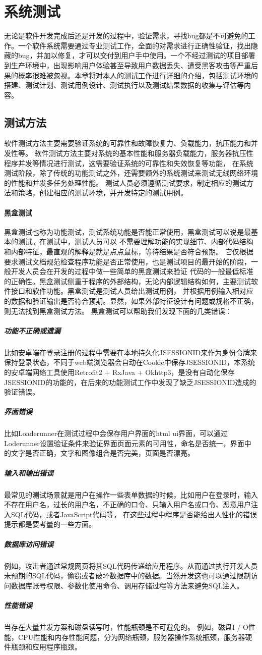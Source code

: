 \section{系统测试}
无论是软件开发完成后还是开发的过程中，验证需求，寻找bug都是不可避免的工作。一个软件系统需要通过专业测试工作，全面的对需求进行正确性验证，找出隐藏的bug，并加以修复，才可以交付到用户手中使用。一个不经过测试的项目部署到生产环境中，出现影响用户体验甚至导致用户数据丢失、遭受黑客攻击等严重后果的概率很难被忽视。本章将对本人的测试工作进行详细的介绍，包括测试环境的搭建、测试计划、测试用例设计、测试执行以及测试结果数据的收集与评估等内容\cite{r31}。
\subsection{测试方法}
软件测试方法主要需要验证系统的可靠性和故障恢复力、负载能力，抗压能力和并发性等。
软件测试方法主要对系统的基本性能和服务器负载能力，服务器抗压性程序并发等情况进行测试，这需要验证系统的可靠性和失效恢复等功能，
在系统测试阶段，除了传统的功能测试之外，还需要额外的系统测试来测试无线网络环境的性能和并发多任务处理性能。
测试人员必须遵循测试要求，制定相应的测试方法和策略，创建相应的测试环境，并开发特定的测试用例。
\paragraph{黑盒测试}
黑盒测试也称为功能测试，测试系统功能是否能正常使用，黑盒测试可以说是最基本的测试。在测试中，测试人员可以
不需要理解功能的实现细节、内部代码结构和内部特征，最直观的解释是就是点点鼠标，等待结果是否符合预期。
它仅根据要求测试文档规范检查程序功能是否正常使用，也是测试项目的最开始的阶段，一般开发人员会在开发的过程中做一些简单的黑盒测试来验证
代码的一般最低标准的正确性。黑盒测试侧重于程序的外部结构，无论内部逻辑结构如何，主要测试软件接口和软件功能。黑盒测试是测试人员给出测试用例，
并根据用例输入相对应的数据和验证输出是否符合预期。显然，如果外部特征设计有问题或规格不正确，则无法找到黑盒测试方法。
黑盒测试可以帮助我们发现下面的几类错误：
\subparagraph{功能不正确或遗漏} 比如安卓端在登录注册的过程中需要在本地持久化JSESSIONID来作为身份令牌来保持登录状态，不同于web端浏览器会自动在Cookie中保存JSESSIONID，本系统的安卓端网络工具使用Retrofit2 + RxJava + Okhttp3，是没有自动化保存JSESSIONID的功能的，在后来的功能测试工作中发现了缺乏JSESSIONID造成的验证错误。
\subparagraph{界面错误} 比如Loaderunner在测试过程中会保存用户界面的html ui界面，可以通过Loderunner设置验证条件来验证界面页面元素的可用性，命名是否统一，界面中的文字是否正确，文字和图像组合是否完美，页面是否漂亮。
\subparagraph{输入和输出错误} 最常见的测试场景就是用户在操作一些表单数据的时候，比如用户在登录时，输入不存在用户名，过长的用户名，不正确的口令、只输入用户名或口令、恶意用户注入SQL代码，或者JavaScript代码等，
在这些过程中程序是否能给出人性化的错误提示都是要考量的一些方面。
\subparagraph{数据库访问错误}例如，攻击者通过常规网页将其SQL代码传递给应用程序。从而通过执行开发人员未预期的SQL代码，偷窃或者破坏数据库中的数据。当然开发这也可以通过限制访问数据库账号权限、参数化使用命令、调用存储过程等方法来避免SQL注入。
\subparagraph{性能错误}当存在大量并发方案和磁盘读写时，性能瓶颈是不可避免的。 例如，磁盘I / O性能，CPU性能和内存性能问题，分为网络瓶颈，服务器操作系统瓶颈，服务器硬件瓶颈和应用程序瓶颈。

